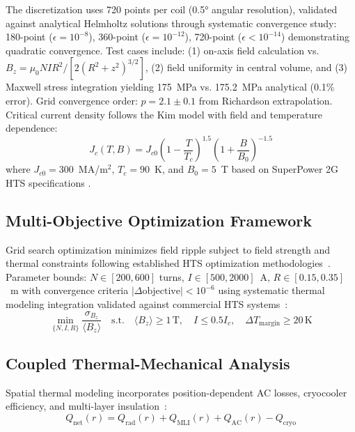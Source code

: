 \documentclass[10pt,twocolumn]{article}
\begin{document}
The discretization uses 720 points per coil (0.5° angular resolution), validated against analytical Helmholtz solutions through systematic convergence study: 180-point ($\epsilon = 10^{-8}$), 360-point ($\epsilon = 10^{-12}$), 720-point ($\epsilon < 10^{-14}$) demonstrating quadratic convergence. Test cases include: (1) on-axis field calculation vs. $B_z = \mu_0 NI R^2 / [2(R^2 + z^2)^{3/2}]$, (2) field uniformity in central volume, and (3) Maxwell stress integration yielding 175~MPa vs. 175.2~MPa analytical (0.1\% error). Grid convergence order: $p = 2.1 \pm 0.1$ from Richardson extrapolation. Critical current density follows the Kim model with field and temperature dependence:
\begin{equation}
J_c(T,B) = J_{c0} \left(1-\frac{T}{T_c}\right)^{1.5} \left(1+\frac{B}{B_0}\right)^{-1.5}
\end{equation}
where $J_{c0}=300$~MA/m$^2$, $T_c=90$~K, and $B_0=5$~T based on SuperPower 2G HTS specifications \cite{superpower2023}.

\subsection{Multi-Objective Optimization Framework}

Grid search optimization minimizes field ripple subject to field strength and thermal constraints following established HTS optimization methodologies~\cite{iwasa2022}. Parameter bounds: $N \in [200,600]$ turns, $I \in [500,2000]$~A, $R \in [0.15,0.35]$~m with convergence criteria $|\Delta \text{objective}| < 10^{-6}$ using systematic thermal modeling integration validated against commercial HTS systems~\cite{hahn2019,sparc2020}:
\begin{equation}
\min_{\{N,I,R\}} \frac{\sigma_{B_z}}{\langle B_z \rangle} \quad \text{s.t.} \quad \langle B_z \rangle \geq 1\,\text{T}, \quad I \leq 0.5 I_c, \quad \Delta T_{\text{margin}} \geq 20\,\text{K}
\end{equation}

\subsection{Coupled Thermal-Mechanical Analysis}

Spatial thermal modeling incorporates position-dependent AC losses, cryocooler efficiency, and multi-layer insulation~\cite{iwasa2022}:
\begin{equation}
Q_{\text{net}}(r) = Q_{\text{rad}}(r) + Q_{\text{MLI}}(r) + Q_{\text{AC}}(r) - Q_{\text{cryo}}
\end{equation}
\end{document}
